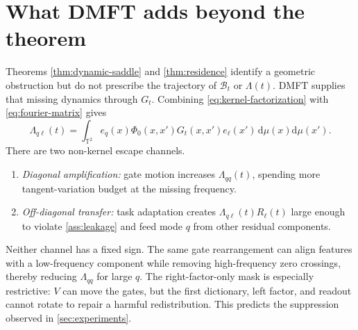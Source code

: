 \documentclass[11pt]{article}
\newcommand{\T}{\mathbb T}
\newcommand{\1}{\mathbf 1}
\newcommand{\dd}{\mathrm d}
\newcommand{\cB}{\mathcal B}
\theoremstyle{plain}
\theoremstyle{definition}
\begin{document}
\section{What DMFT adds beyond the theorem}
\label{sec:mechanism}

Theorems \ref{thm:dynamic-saddle} and \ref{thm:residence} identify a
geometric obstruction but do not prescribe the trajectory of \(\cB_t\) or
\(\Lambda(t)\).  DMFT supplies that missing dynamics through \(G_t\).
Combining \eqref{eq:kernel-factorization} with
\eqref{eq:fourier-matrix} gives
\begin{equation}
 \Lambda_{q\ell}(t)
 =\int_{\T^2}e_q(x)\Phi_0(x,x')G_t(x,x')e_\ell(x')
 \,\dd\mu(x)\dd\mu(x').
 \label{eq:dmft-fourier}
\end{equation}
There are two non-kernel escape channels.

\begin{enumerate}[leftmargin=2em]
\item \emph{Diagonal amplification:} gate motion increases
\(\Lambda_{qq}(t)\), spending more tangent-variation budget at the missing
frequency.
\item \emph{Off-diagonal transfer:} task adaptation creates
\(\Lambda_{q\ell}(t)R_\ell(t)\) large enough to violate
\cref{ass:leakage} and feed mode \(q\) from other residual components.
\end{enumerate}

Neither channel has a fixed sign.  The same gate rearrangement can align
features with a low-frequency component while removing high-frequency zero
crossings, thereby reducing \(\Lambda_{qq}\) for large \(q\).  The
right-factor-only mask is especially restrictive: \(V\) can move the gates,
but the first dictionary, left factor, and readout cannot rotate to repair a
harmful redistribution.  This predicts the suppression observed in
\cref{sec:experiments}.
\end{document}
